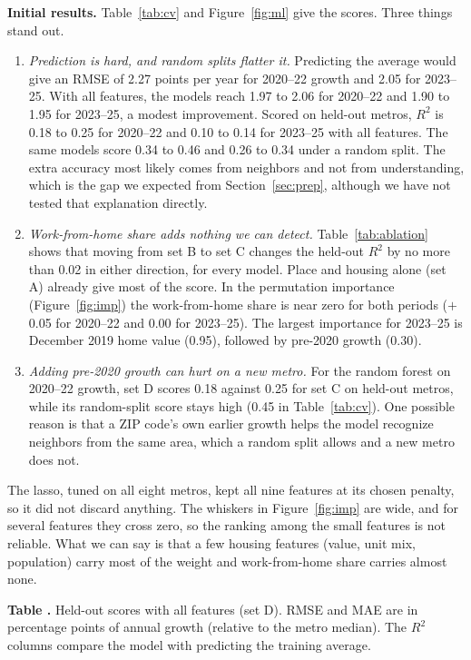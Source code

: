\documentclass[11pt]{article}
\newcounter{tabnum}
\newcommand{\tab}[3]{%
  \begin{table}[!tbp]\centering
  \refstepcounter{tabnum}\label{#2}%
  {\small\raggedright\textbf{Table \thetabnum.} #3\par}\vspace{3pt}
  
  \end{table}}
\begin{document}
\textbf{Initial results.} Table~\ref{tab:cv} and Figure~\ref{fig:ml} give the scores. Three things stand out.
\begin{enumerate}
\item \emph{Prediction is hard, and random splits flatter it.} Predicting the average would give an RMSE of 2.27 points per year
for 2020--22 growth and 2.05 for 2023--25. With all features, the models reach 1.97 to 2.06 for 2020--22 and 1.90 to 1.95 for 2023--25, a modest improvement. Scored on held-out metros, $R^2$ is 0.18 to 0.25 for
2020--22 and 0.10 to 0.14 for 2023--25 with all features. The same models score 0.34 to 0.46 and 0.26 to 0.34 under a random
split. The extra accuracy most likely comes from neighbors and not from understanding, which is the gap we expected from Section~\ref{sec:prep}, although we have not tested that explanation directly.
\item \emph{Work-from-home share adds nothing we can detect.} Table~\ref{tab:ablation} shows that moving from set B to set C
changes the held-out $R^2$ by no more than 0.02 in either direction, for every model. Place and housing alone (set A) already give
most of the score. In the permutation importance (Figure~\ref{fig:imp}) the work-from-home share is near zero for both periods
($+$0.05 for 2020--22 and 0.00 for 2023--25). The largest importance for 2023--25 is December 2019 home value (0.95), followed
by pre-2020 growth (0.30).
\item \emph{Adding pre-2020 growth can hurt on a new metro.} For the random forest on 2020--22 growth, set D scores 0.18 against 0.25
for set C on held-out metros, while its random-split score stays high (0.45 in Table~\ref{tab:cv}). One possible reason is that a ZIP code's own earlier growth helps
the model recognize neighbors from the same area, which a random split allows and a new metro does not.
\end{enumerate}
The lasso, tuned on all eight metros, kept all nine features at its chosen penalty, so it did not discard anything. The whiskers in
Figure~\ref{fig:imp} are wide, and for several features they cross zero, so the ranking among the small features is not reliable.
What we can say is that a few housing features (value, unit mix, population) carry most of the weight and work-from-home share
carries almost none.

\tab{t_m_cv}{tab:cv}{Held-out scores with all features (set D). RMSE and MAE are in percentage points of annual growth
(relative to the metro median). The $R^2$ columns compare the model with predicting the training average.}
\end{document}
